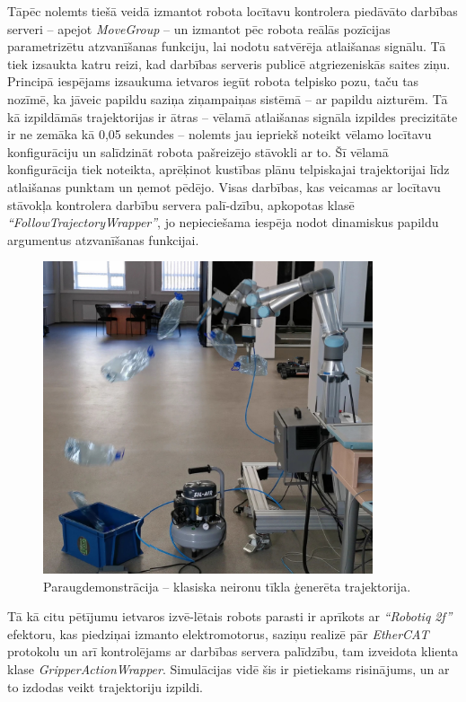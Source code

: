 \documentclass[12pt, a4paper]{article}
\numberwithin{equation}{section} %
\begin{document}
Tāpēc nolemts tiešā veidā izmantot robota locītavu kontrolera piedāvāto darbības serveri -- apejot \textit{MoveGroup} -- un izmantot pēc robota reālās pozīcijas parametrizētu atzvanīšanas funkciju, lai nodotu satvērēja atlaišanas signālu. Tā tiek izsaukta katru reizi, kad darbības serveris publicē atgriezeniskās saites ziņu. Principā iespējams izsaukuma ietvaros iegūt robota telpisko pozu, taču tas nozīmē, ka jāveic papildu saziņa ziņampaiņas sistēmā -- ar papildu aizturēm. Tā kā izpildāmās trajektorijas ir ātras -- vēlamā atlaišanas signāla izpildes precizitāte ir ne zemāka kā 0,05 sekundes -- nolemts jau iepriekš noteikt vēlamo locītavu konfigurāciju un salīdzināt robota pašreizējo stāvokli ar to. Šī vēlamā konfigurācija tiek noteikta, aprēķinot kustības plānu telpiskajai trajektorijai līdz atlaišanas punktam un ņemot pēdējo. Visas darbības, kas veicamas ar locītavu stāvokļa kontrolera darbību servera palī-dzību, apkopotas klasē \textit{``FollowTrajectoryWrapper''}, jo nepieciešama iespēja nodot dinamiskus papildu argumentus atzvanīšanas funkcijai. 

\begin{figure}[t!]
    \centering
    \includegraphics[height=9.2cm,page=1]{../img/action_sequence.png}
    \caption{Paraugdemonstrācija -- klasiska neironu tīkla ģenerēta trajektorija.}
\end{figure}


Tā kā citu pētījumu ietvaros izvē-lētais robots parasti ir aprīkots ar \textit{``Robotiq 2f''} efektoru, kas piedziņai izmanto elektromotorus, saziņu realizē pār \textit{EtherCAT} protokolu un arī kontrolējams ar darbības servera palīdzību, tam izveidota klienta klase \textit{GripperActionWrapper}. Simulācijas vidē šis ir pietiekams risinājums, un ar to izdodas veikt trajektoriju izpildi.
\end{document}
